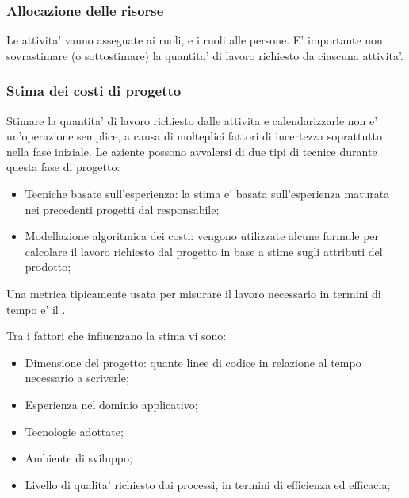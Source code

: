 

\subsubsection{Allocazione delle risorse}

Le attivita' vanno assegnate ai ruoli, e i ruoli alle persone. E' importante non
sovrastimare (o sottostimare) la quantita' di lavoro richiesto da ciascuna
attivita'.

\subsubsection{Stima dei costi di progetto}

Stimare la quantita' di lavoro richiesto dalle attivita e calendarizzarle non e'
un'operazione semplice, a causa di molteplici fattori di incertezza soprattutto
nella fase iniziale. Le aziente possono avvalersi di due tipi di tecnice durante
questa fase di progetto:

\begin{itemize}
  \item Tecniche basate sull'esperienza: la stima e' basata sull'esperienza
    maturata nei precedenti progetti dal responsabile;
  \item Modellazione algoritmica dei costi: vengono utilizzate alcune formule
    per calcolare il lavoro richiesto dal progetto in base a stime sugli
    attributi del prodotto;
\end{itemize}

Una \gls{metrica} tipicamente usata per misurare il lavoro necessario in termini
di tempo e' il .

Tra i fattori che influenzano la stima vi sono:

\begin{itemize}
  \item Dimensione del progetto: quante linee di codice in relazione al
    tempo necessario a scriverle;
  \item Esperienza nel dominio applicativo;
  \item Tecnologie adottate;
  \item Ambiente di sviluppo;
  \item Livello di qualita' richiesto dai processi, in termini di
    efficienza ed efficacia;
\end{itemize}

